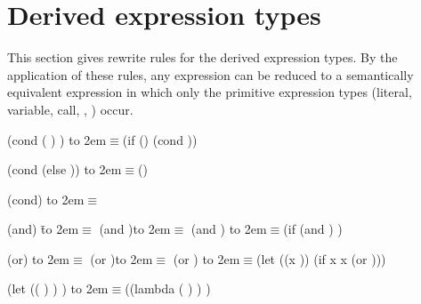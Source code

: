 \section{Derived expression types}
\label{derivedsection}

This section gives rewrite rules for the derived expression types.  By
the application of these rules, any expression can be reduced to a
semantically equivalent expression in which only the primitive
expression types (literal, variable, call, , ) occur.

\newcommand{\iet}{\hbox to 2em{\hfil $\equiv$}}  %

\begin{schemenoindent}
(cond ( )
       \dotsfoo)
\iet  (if 
          ()
          (cond  \dotsfoo))

(cond (else ))
\iet  ()

(cond)
\iet  {}
\end{schemenoindent}

\begin{schemenoindent}
(and)         \=\iet  \schtrue
(and )\>\iet  {}
(and   \dotsfoo)
\iet  (if  (and  \dotsfoo) \schfalse{})

(or)          \>\iet  \schfalse
(or )\>\iet  {}
(or   \dotsfoo)
\iet  (let ((x ))
        (if x x (or  \dotsfoo)))

(let (( ) \dotsfoo)
  )
\iet  ((lambda ( \dotsfoo) )  \dotsfoo)
\end{schemenoindent}

